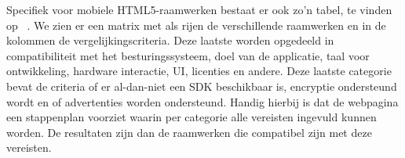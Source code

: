 Specifiek voor mobiele HTML5-raamwerken bestaat er ook zo'n tabel,  te vinden op ~\cite{Falk2011}.  
We zien er een matrix met als rijen de verschillende raamwerken en in de kolommen de vergelijkingscriteria.  
Deze laatste worden opgedeeld in compatibiliteit met het besturingssysteem,  doel van de applicatie,  taal voor ontwikkeling,  hardware interactie,  UI,  licenties en andere.  
Deze laatste categorie bevat de criteria of er al-dan-niet een SDK beschikbaar is, encryptie ondersteund wordt en of advertenties worden ondersteund.  
Handig hierbij is dat de webpagina een stappenplan voorziet waarin per categorie alle vereisten ingevuld kunnen worden.  
De resultaten zijn dan de raamwerken die compatibel zijn met deze vereisten.

